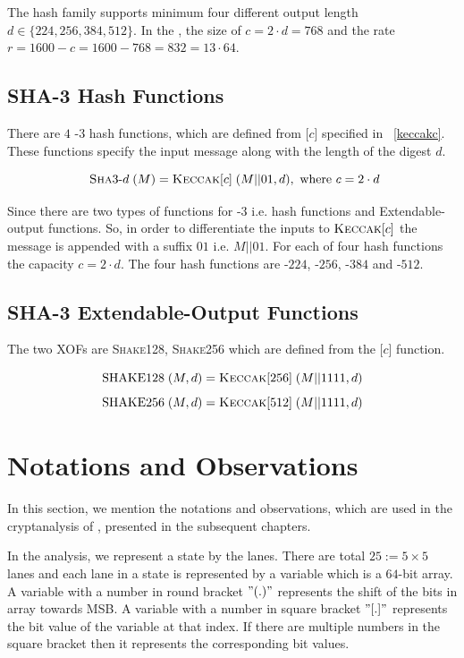 The  hash family supports minimum four different output length $d \in \{224,256,384,512\}$. In the , the size of $c = 2\cdot d = 768$ and the rate $r = 1600 - c = 1600 - 768 = 832 = 13 \cdot 64$.

\subsection{SHA-3 Hash Functions}

There are $4$ \SHA-$3$ hash functions, which are defined from \KECCAK{}[$c$] specified in ~\ref{keccakc}. These functions specify the input message along with the length of the digest $d$.

\[
   \text{ \textsc{Sha}3-}d\;(M) = \mbox{\textsc{Keccak}}{}[c]\;(M||01 , d), \text{ where } c = 2 \cdot d
\]

Since there are two types of functions for \SHA-$3$ i.e. hash functions and Extendable-output functions. So, in order to differentiate the inputs to $\mbox{\textsc{Keccak}}{}[c]$ the message is appended with a suffix $01$ i.e. $M||01$. For each of four hash functions the capacity $c = 2\cdot d$. The four hash functions are -$224$, -$256$, -$384$ and -$512$.

\subsection{SHA-3 Extendable-Output Functions}

The two  XOFs are \textsc{Shake}128, \textsc{Shake}256 which are defined from the \KECCAK{}[$c$] function.

\[
    \text{SHAKE}128\;(M,d) = \mbox{\textsc{Keccak}}{}[256]\;(M||1111 , d)
\]
\[
    \text{SHAKE}256\;(M,d) = \mbox{\textsc{Keccak}}{}[512]\;(M||1111 , d)
\]

\section{Notations and Observations}
In this section, we mention the notations and observations, which are used in the cryptanalysis of \KECCAK{}, presented in the subsequent chapters.

In the analysis, we represent a \KECCAK{} state by the lanes. There are 
 total $25:=5 \times 5$ lanes and each lane in a state is represented by a
 variable which is a $64$-bit array. 
A variable with a number in round bracket $"( . )"$ represents the shift of the bits in array towards MSB. A variable with a number in square bracket $"[ . ]"$ represents the bit value of the variable at that index. If there are multiple numbers in the square bracket then it represents the corresponding bit values.

